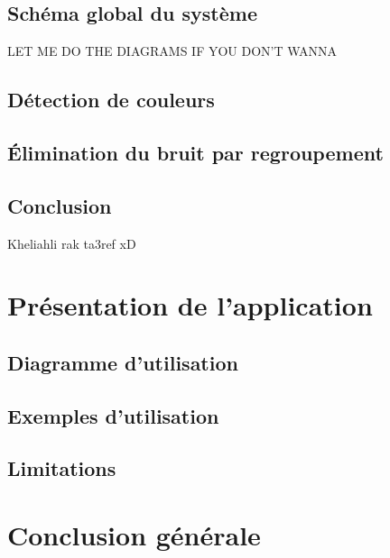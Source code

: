 \documentclass[12pt]{report}
\begin{document}
\section{Schéma global du système}
LET ME DO THE DIAGRAMS IF YOU DON'T WANNA
\section{Détection de couleurs}
\section{Élimination du bruit par regroupement}

\section{Conclusion}
Kheliahli rak ta3ref xD 


\chapter{Présentation de l'application}

\section{Diagramme d'utilisation}
\section{Exemples d'utilisation}
\section{Limitations}

\chapter{Conclusion générale}
\paragraph{}
\end{document}
